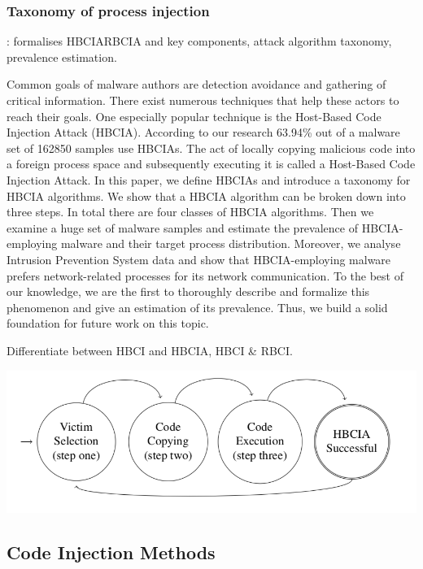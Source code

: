 \documentclass{article}
\begin{document}
\subsubsection{Taxonomy of process injection}

\textbf{}: \textcite{Barabosch:2014}  formalises HBCIA\/RBCIA and key components, attack algorithm taxonomy, prevalence estimation.

Common goals of malware authors are detection avoidance and gathering of critical information. There exist numerous techniques that help these actors to reach their goals. One especially popular technique is the Host-Based Code Injection Attack (HBCIA). According to our research 63.94\% out of a malware set of 162850 samples use HBCIAs. The act of locally copying malicious code into a foreign process space and subsequently executing it is called a Host-Based Code Injection Attack. In this paper, we define HBCIAs and introduce a taxonomy for HBCIA algorithms. We show that a HBCIA algorithm can be broken down into three steps. In total there are four classes of HBCIA algorithms. Then we examine a huge set of malware samples and estimate the prevalence of HBCIA-employing malware and their target process distribution. Moreover, we analyse Intrusion Prevention System data and show that HBCIA-employing malware prefers network-related processes for its network communication. To the best of our knowledge, we are the first to thoroughly describe and formalize this phenomenon and give an estimation of its prevalence. Thus, we build a solid foundation for future work on this topic.

Differentiate between HBCI and HBCIA, HBCI \& RBCI.

\includegraphics[scale=0.4]{hbcia_3step_algo.png}

\subsection{Code Injection Methods}
\end{document}
